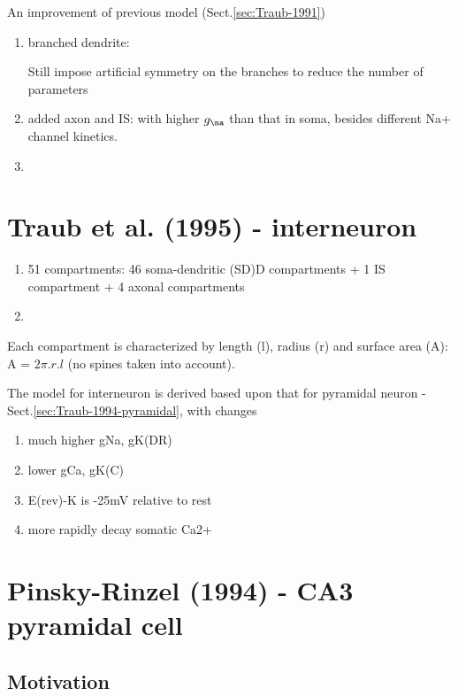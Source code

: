 An improvement of previous model (Sect.\ref{sec:Traub-1991})
\begin{enumerate}
  \item branched dendrite:
 
Still impose artificial symmetry on the branches to reduce the number of
parameters


  \item added axon and IS: with higher $g_\na$ than that in soma, besides
  different Na+ channel kinetics.
  
  \item 
\end{enumerate}

\section{Traub et al. (1995) - interneuron}
\label{sec:Traub-1995-interneuron}

\begin{enumerate}
  \item 51 compartments: 46 soma-dendritic (SD)D compartments + 1 IS compartment
  + 4 axonal compartments
  
  \item 
\end{enumerate}
Each compartment is characterized by length (l), radius (r) and surface area
(A): A = $2\pi .r. l$ (no spines taken into account).

The model for interneuron is derived based upon that for pyramidal neuron -
Sect.\ref{sec:Traub-1994-pyramidal}, with changes
\begin{enumerate}	
  \item much higher gNa, gK(DR)
  
  \item lower gCa, gK(C)
  
  \item E(rev)-K is -25mV relative to rest
  
  \item more rapidly decay somatic Ca2+
\end{enumerate}



\section{Pinsky-Rinzel (1994) - CA3 pyramidal cell}
\label{sec:Pinksy-Rinzel-1994}


\subsection{Motivation}
\label{sec:motivation-1}

